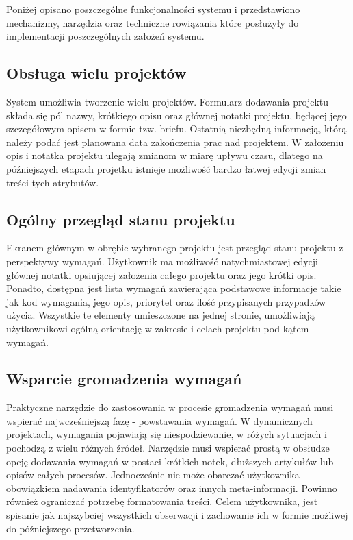     Poniżej opisano poszczególne funkcjonalności systemu i przedstawiono mechanizmy, narzędzia oraz techniczne rowiązania które posłużyły do implementacji poszczególnych założeń systemu.

    \subsection{Obsługa wielu projektów} 
      System umożliwia tworzenie wielu projektów. Formularz dodawania projektu składa się pól nazwy, krótkiego opisu oraz głównej notatki projektu, będącej jego szczegółowym opisem w formie tzw. briefu. Ostatnią niezbędną informacją, którą należy podać jest planowana data zakończenia prac nad projektem. W założeniu opis i notatka projektu ulegają zmianom w miarę upływu czasu, dlatego na późniejszych etapach projetku istnieje możliwość bardzo łatwej edycji zmian treści tych atrybutów. 

    \subsection{Ogólny przegląd stanu projektu}
      Ekranem głównym w obrębie wybranego projektu jest przegląd stanu projektu z perspektywy wymagań. Użytkownik ma możliwość natychmiastowej edycji głównej notatki opsiującej założenia całego projektu oraz jego krótki opis. Ponadto, dostępna jest lista wymagań zawierająca podstawowe informacje takie jak kod wymagania, jego opis, priorytet oraz ilość przypisanych przypadków użycia. Wszystkie te elementy umieszczone na jednej stronie, umożliwiają użytkownikowi ogólną orientację w zakresie i celach projektu pod kątem wymagań. 

    \subsection{Wsparcie gromadzenia wymagań}
      Praktyczne narzędzie do zastosowania w procesie gromadzenia wymagań musi wspierać najwcześniejszą fazę - powstawania wymagań. W dynamicznych projektach, wymagania pojawiają się niespodziewanie, w różych sytuacjach i pochodzą z wielu różnych źródeł. Narzędzie musi wspierać prostą w obsłudze opcję dodawania wymagań w postaci krótkich notek, dłuższych artykułów lub opisów całych procesów. Jednocześnie nie może obarczać użytkownika obowiązkiem nadawania identyfikatorów oraz innych meta-informacji. Powinno również ograniczać potrzebę formatowania treści. Celem użytkownika, jest spisanie jak najszybciej wszystkich obserwacji i zachowanie ich w formie możliwej do późniejszego przetworzenia.

